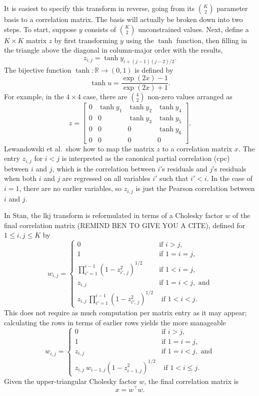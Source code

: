 \documentclass[10pt]{report}
\newcommand{\Stan}{Stan\xspace}
\newcommand{\acronym}[1]{{\sc #1}\xspace}
\newcommand{\LKJ}{\acronym{lkj}}
\newcommand{\CPC}{\acronym{cpc}}
\begin{document}
It is easiest to specify this transform in reverse, going from its $K
\choose 2$ parameter basis to a correlation matrix.  The basis will
actually be broken down into two steps.  To start, suppose $y$
consists of $K \choose 2$ unconstrained values.  Next, define a $K
\times K$ matrix $z$ by first transforming $y$ using the $\tanh$
function, then filling in
the triangle above the diagonal in column-major order with the results,
%
\[
z_{i,j}
= \tanh y_{i + (j - 1)(j - 2)/2}.
\]
%
The bijective function $\tanh : \mathbb{R} \rightarrow (0,1)$ is defined by
%
\[
\tanh u = \frac{\exp(2x) - 1}{\exp(2x) + 1}.
\]
%
For example, in the $4 \times 4$ case, there are ${4 \choose 2}$
non-zero values arranged as
%
\[
z 
=
\left[
\begin{array}{cccc}
0 & \tanh y_1 & \tanh y_2 & \tanh y_4
\\
0 & 0 & \tanh y_3 & \tanh y_5
\\
0 & 0 & 0 & \tanh y_6
\\
0 & 0 & 0 & 0
\end{array}
\right]
.
\]
%
Lewandowski et al.\ show how to map the matrix $z$ to a correlation
matrix $x$.  The entry $z_{i,j}$ for $i < j$ is interpreted as the
canonical partial correlation (\CPC) between $i$ and $j$, which is the
correlation between $i$'s residuals and $j$'s residuals when both $i$
and $j$ are regressed on all variables $i'$ such that $i'< i$.
In the case of $i=1$, there are no earlier variables, 
so $z_{i,j}$ is just the Pearson correlation between $i$ and $j$.

In \Stan, the \LKJ transform is reformulated in terms of a Cholesky factor $w$
of the final correlation matrix (REMIND BEN TO GIVE YOU A CITE), defined for $1 \leq i,j \leq K$ by
%
\[
w_{i,j} = 
\left\{
\begin{array}{cl}
%
0 & \mbox{if } i > j,
\\[4pt]
1 & \mbox{if } 1 = i = j,
\\[12pt]
\prod_{i'=1}^{i - 1} \left( 1 - z_{i'\!,\,j}^2 \right)^{1/2}
& \mbox{if } 1 < i = j,
\\[12pt]
z_{i,j} & \mbox{if } 1 = i < j, \mbox{ and}
\\[12pt]
z_{i,j} \, \prod_{i'=1}^{i-1} \left( 1 - z_{i'\!,\,j}^2 \right)^{1/2}
& \mbox{ if } 1 < i < j.
%
\end{array}
\right.
\]
%
This does not require as much computation per matrix entry as it may appear; 
calculating the rows in terms of earlier rows yields the more manageable
%
\[
w_{i,j} = 
\left\{
\begin{array}{cl}
%
0 & \mbox{if } i > j,
\\[4pt]
1 & \mbox{if } 1 = i = j, 
\\[8pt]
z_{i,j} & \mbox{if } 1 = i < j, \mbox{ and}
\\[8pt]
z_{i,j} \ w_{i-1,j} \left( 1 - z_{i-1,j}^2 \right)^{1/2}
& \mbox{ if } 1 < i \leq j.
%
\end{array}
\right.
\]
Given the upper-triangular Cholesky factor $w$, the final correlation
matrix is
\[
x = w^{\top} w.
\]
\end{document}
